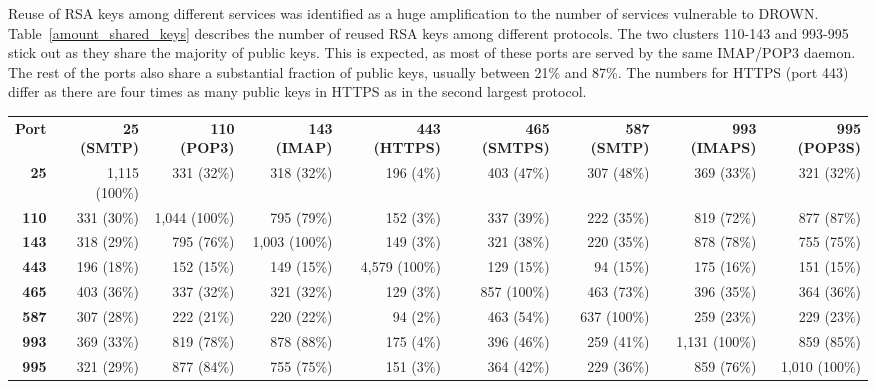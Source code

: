 \documentclass[letterpaper,twocolumn,10pt]{article}
\theoremstyle{plain}
\begin{document}
Reuse of RSA keys among different services was identified as a huge amplification to the number of services vulnerable to DROWN\@. Table~\ref{amount_shared_keys} describes the number of reused RSA keys among different protocols. The two clusters 110-143 and 993-995 stick out as they share the majority of public keys. This is expected, as most of these ports are served by the same IMAP/POP3 daemon. 
The rest of the ports also share a substantial fraction of public keys, usually between 21\% and 87\%. The numbers for HTTPS (port 443) differ as there are four times as many public keys in HTTPS as in the second largest protocol.
\begin{table*}[th]
\centering\footnotesize
 \begin{tabular}{rrrrrrrrr} 
\toprule

\textbf{Port} & \textbf{25 (SMTP)} & \textbf{110 (POP3)} & \textbf{143 (IMAP)} & \textbf{443 (HTTPS)} & \textbf{465 (SMTPS)} & \textbf{587 (SMTP)} & \textbf{993 (IMAPS)} & \textbf{995 (POP3S)}\smallskip\\
\textbf{ 25} &  1,115 (100\%) &           331 (32\%) &       318 (32\%) &       196 (4\%) &        403 (47\%) &       307 (48\%) &       369 (33\%) &       321 (32\%) \\
\textbf{110} &    331 (30\%) &         1,044 (100\%) &      795 (79\%) &       152 (3\%) &        337 (39\%) &       222 (35\%) &       819 (72\%) &       877 (87\%) \\
\textbf{143} &    318 (29\%) &           795 (76\%) &     1,003 (100\%) &      149 (3\%) &        321 (38\%) &       220 (35\%) &       878 (78\%) &       755 (75\%) \\
\textbf{443} &    196 (18\%) &           152 (15\%) &       149 (15\%) &     4,579 (100\%) &      129 (15\%) &        94 (15\%) &       175 (16\%) &       151 (15\%) \\
\textbf{465} &    403 (36\%) &           337 (32\%) &       321 (32\%) &       129 (3\%) &        857 (100\%) &      463 (73\%) &       396 (35\%) &       364 (36\%) \\
\textbf{587} &    307 (28\%) &           222 (21\%) &       220 (22\%) &        94 (2\%) &        463 (54\%) &       637 (100\%) &      259 (23\%) &       229 (23\%) \\
\textbf{993} &    369 (33\%) &           819 (78\%) &       878 (88\%) &       175 (4\%) &        396 (46\%) &       259 (41\%) &     1,131 (100\%) &      859 (85\%) \\
\textbf{995} &    321 (29\%) &           877 (84\%) &       755 (75\%) &       151 (3\%) &        364 (42\%) &       229 (36\%) &       859 (76\%) &     1,010 (100\%) \\

\bottomrule
 \end{tabular}
 \caption{\textbf{Impact of key reuse across ports.} Number of shared public keys among two ports, in thousands.
          Each column states what number and percentage of keys from the port in the header row are used on other ports.
          For example, 18\% of keys used on port 25 are also used on port 443, but only 4\% of keys used on port 443 are also used on port 25. }
 \label{amount_shared_keys}
\end{table*}
\end{document}
